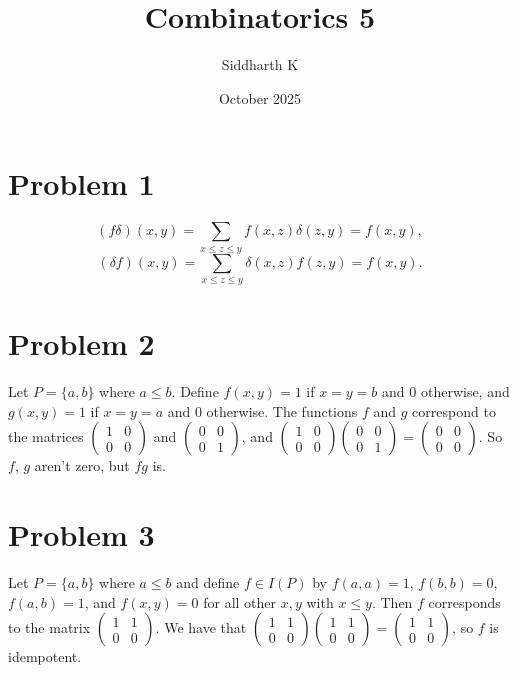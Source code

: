 \documentclass{article}
\title{Combinatorics 5}
\author{Siddharth K}
\date{October 2025}
\begin{document}
\maketitle

\section*{Problem 1}
$$(f\delta)(x, y) = \sum_{x \le z \le y} f(x, z)\delta(z, y) = f(x, y),$$
$$(\delta f)(x, y) = \sum_{x \le z \le y} \delta(x, z)f(z, y) = f(x, y).$$

\section*{Problem 2}
Let $P = \{a, b\}$ where $a \le b$. Define $f(x, y) = 1$ if $x = y = b$ and $0$ otherwise, and $g(x, y) = 1$ if $x = y = a$ and $0$ otherwise. The functions $f$ and $g$ correspond to the matrices $\begin{pmatrix} 1&0 \\ 0&0 \end{pmatrix}$ and $\begin{pmatrix} 0&0 \\ 0&1 \end{pmatrix}$, and $\begin{pmatrix} 1&0 \\ 0&0 \end{pmatrix}\begin{pmatrix} 0&0 \\ 0&1 \end{pmatrix} = \begin{pmatrix} 0&0 \\ 0&0 \end{pmatrix}$. So $f$, $g$ aren't zero, but $fg$ is.

\section*{Problem 3}
Let $P = \{a, b\}$ where $a \le b$ and define $f \in I(P)$ by $f(a, a) = 1$, $f(b, b) = 0$, $f(a, b) = 1$, and $f(x, y) = 0$ for all other $x, y$ with $x \le y$. Then $f$ corresponds to the matrix $\begin{pmatrix} 1&1 \\ 0&0 \end{pmatrix}$. We have that $\begin{pmatrix} 1&1 \\ 0&0 \end{pmatrix}\begin{pmatrix} 1&1 \\ 0&0 \end{pmatrix} = \begin{pmatrix} 1&1 \\ 0&0 \end{pmatrix}$, so $f$ is idempotent.
\end{document}
